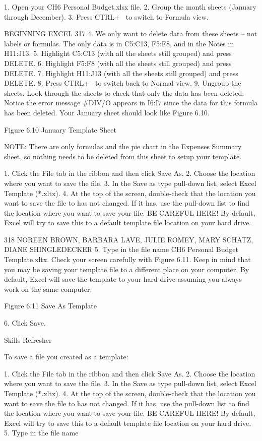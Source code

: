 1. Open your CH6 Personal Budget.xlsx file.
2. Group the month sheets (January through December).
3. Press CTRL+~ to switch to Formula view.

BEGINNING EXCEL 317
4. We only want to delete data from these sheets – not labels or formulas. The only data is in
C5:C13, F5:F8, and in the Notes in H11:J13.
5. Highlight C5:C13 (with all the sheets still grouped) and press DELETE.
6. Highlight F5:F8 (with all the sheets still grouped) and press DELETE.
7. Highlight H11:J13 (with all the sheets still grouped) and press DELETE.
8. Press CTRL+~ to switch back to Normal view.
9. Ungroup the sheets. Look through the sheets to check that only the data has been deleted.
Notice the error message #DIV/O appears in I6:I7 since the data for this formula has been
deleted. Your January sheet should look like Figure 6.10.




Figure 6.10 January Template Sheet


NOTE: There are only formulas and the pie chart in the Expenses Summary sheet, so nothing needs
to be deleted from this sheet to setup your template.

1.   Click the File tab in the ribbon and then click Save As.
2.   Choose the location where you want to save the file.
3.   In the Save as type pull-down list, select Excel Template (*.xltx).
4.   At the top of the screen, double-check that the location you want to save the file to has not
changed. If it has, use the pull-down list to find the location where you want to save your file. BE
CAREFUL HERE! By default, Excel will try to save this to a default template file location on
your hard drive.

318 NOREEN BROWN, BARBARA LAVE, JULIE ROMEY, MARY SCHATZ, DIANE SHINGLEDECKER
5. Type in the file name CH6 Personal Budget Template.xltx. Check your screen carefully with
Figure 6.11. Keep in mind that you may be saving your template file to a different place on your
computer. By default, Excel will save the template to your hard drive assuming you always work
on the same computer.




Figure 6.11 Save As Template


6. Click Save.


Skills Refresher


To save a file you created as a template:

1. Click the File tab in the ribbon and then click Save As.
2. Choose the location where you want to save the file.
3. In the Save as type pull-down list, select Excel Template (*.xltx).
4. At the top of the screen, double-check that the location you want to save the file to has not changed. If it
has, use the pull-down list to find the location where you want to save your file. BE CAREFUL HERE! By
default, Excel will try to save this to a default template file location on your hard drive.
5. Type in the file name



